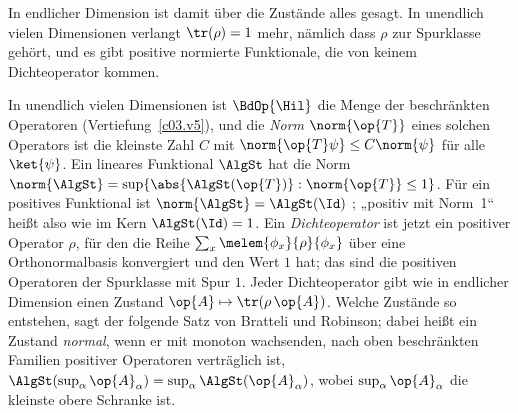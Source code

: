 In endlicher Dimension ist damit über die Zustände alles gesagt. In unendlich vielen Dimensionen
verlangt $\tr(\rho) = 1$ mehr, nämlich dass $\rho$ zur Spurklasse gehört, und es gibt positive
normierte Funktionale, die von keinem Dichteoperator kommen.

\begin{vertiefung}[id=c04.v1,
    titel={Zustände in unendlich vielen Dimensionen},
    wozu={Im Kern sind die positiven normierten Funktionale genau die Dichteoperatoren
      (Proposition~\ref{c04.prop.funktionale}). P2 verlangt $\tr(\rho) = 1$; in unendlich vielen
      Dimensionen setzt das die Spurklasse voraus, und es gibt Zustände, die von keinem
      Dichteoperator kommen. Hier steht, welche Zustände die Dichteoperatoren sind, und ein
      Zustand, der keiner ist.},
    voraussetzung={Abschnitt~\ref{c04.s1.1}; Vertiefungen~\ref{c03.v1} und~\ref{c03.v5}
      (beschränkte Operatoren). Der Kern braucht den Block nicht.},
    zurueck={Die Dichteoperatoren sind die normalen Zustände. In endlicher Dimension sind das alle
      Zustände; in unendlich vielen Dimensionen gibt es weitere, und der Kurs benutzt sie nicht.}]
  In unendlich vielen Dimensionen ist $\BdOp{\Hil}$ die Menge der beschränkten Operatoren
  (Vertiefung~\ref{c03.v5}), und die \emph{Norm} $\norm{\op{T}}$ eines solchen Operators ist die
  kleinste Zahl $C$ mit $\norm{\op{T}\psi} \leq C\norm{\psi}$ für alle $\ket{\psi}$. Ein lineares
  Funktional $\AlgSt$ hat die Norm $\norm{\AlgSt} = \sup\{\abs{\AlgSt(\op{T})} : \norm{\op{T}} \leq 1\}$.
  Für ein positives Funktional ist $\norm{\AlgSt} = \AlgSt(\Id)$ ;
  „positiv mit Norm~1“ heißt also wie im Kern $\AlgSt(\Id) = 1$. Ein \emph{Dichteoperator} ist jetzt
  ein positiver Operator $\rho$, für den die Reihe $\sum_x \melem{\phi_x}{\rho}{\phi_x}$ über eine
  Orthonormalbasis konvergiert und den Wert $1$ hat; das sind die positiven Operatoren der
  Spurklasse mit Spur $1$. Jeder Dichteoperator gibt wie in endlicher Dimension einen Zustand
  $\op{A} \mapsto \tr(\rho\,\op{A})$. Welche Zustände so entstehen, sagt der folgende Satz von
  Bratteli und Robinson; dabei heißt ein Zustand \emph{normal}, wenn er mit monoton wachsenden,
  nach oben beschränkten Familien positiver Operatoren verträglich ist,
  $\AlgSt(\sup_\alpha \op{A}_\alpha) = \sup_\alpha \AlgSt(\op{A}_\alpha)$, wobei $\sup_\alpha \op{A}_\alpha$ die
  kleinste obere Schranke ist.


\end{vertiefung}
